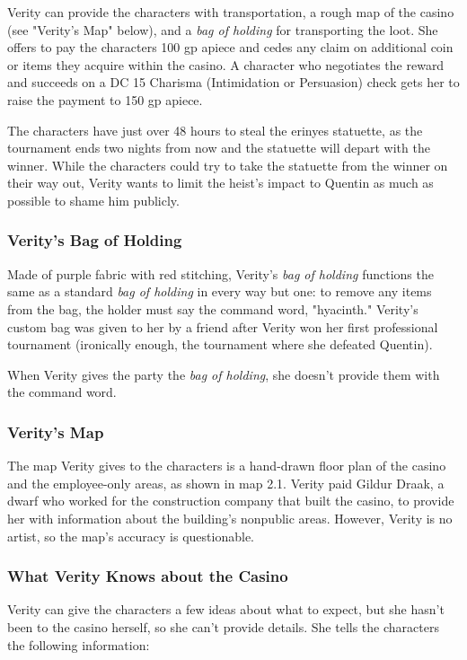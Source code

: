 \documentclass[10pt,a4paper,twoside,bg=print,twocolumn,openany,nodeprecatedcode]{dndbook}
\begin{document}
Verity can provide the characters with transportation, a rough map of the casino (see "Verity's Map" below), and a \textit{bag of holding} for transporting the loot. She offers to pay the characters 100 gp apiece and cedes any claim on additional coin or items they acquire within the casino. A character who negotiates the reward and succeeds on a DC 15 Charisma (Intimidation or Persuasion) check gets her to raise the payment to 150 gp apiece.

The characters have just over 48 hours to steal the erinyes statuette, as the tournament ends two nights from now and the statuette will depart with the winner. While the characters could try to take the statuette from the winner on their way out, Verity wants to limit the heist's impact to Quentin as much as possible to shame him publicly.

\subsubsection{Verity's Bag of Holding}
Made of purple fabric with red stitching, Verity's \textit{bag of holding} functions the same as a standard \textit{bag of holding} in every way but one: to remove any items from the bag, the holder must say the command word, "hyacinth." Verity's custom bag was given to her by a friend after Verity won her first professional tournament (ironically enough, the tournament where she defeated Quentin).

When Verity gives the party the \textit{bag of holding}, she doesn't provide them with the command word.

\subsubsection{Verity's Map}
The map Verity gives to the characters is a hand-drawn floor plan of the casino and the employee-only areas, as shown in map 2.1. Verity paid Gildur Draak, a dwarf who worked for the construction company that built the casino, to provide her with information about the building's nonpublic areas. However, Verity is no artist, so the map's accuracy is questionable.

\subsubsection{What Verity Knows about the Casino}
Verity can give the characters a few ideas about what to expect, but she hasn't been to the casino herself, so she can't provide details. She tells the characters the following information:
\end{document}
